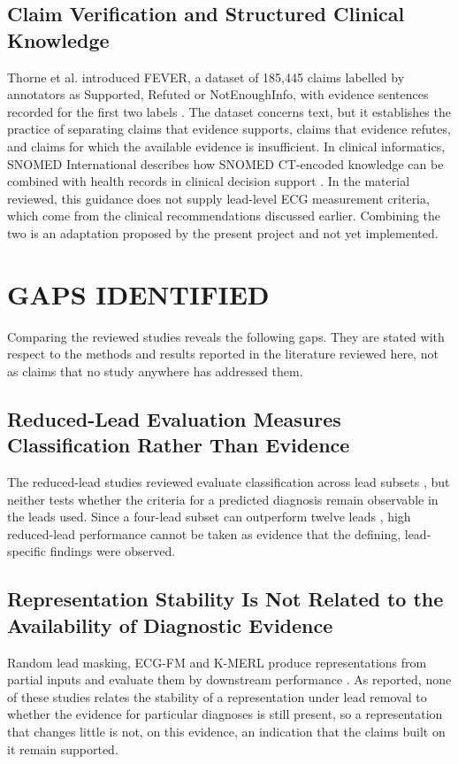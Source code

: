\subsection*{Claim Verification and Structured Clinical Knowledge}
Thorne et al. introduced FEVER, a dataset of 185,445 claims labelled by annotators as Supported, Refuted or NotEnoughInfo, with evidence sentences recorded for the first two labels \cite{THORNE2018FEVER}. The dataset concerns text, but it establishes the practice of separating claims that evidence supports, claims that evidence refutes, and claims for which the available evidence is insufficient. In clinical informatics, SNOMED International describes how SNOMED CT-encoded knowledge can be combined with health records in clinical decision support \cite{SNOMED2026CDSGUIDE}. In the material reviewed, this guidance does not supply lead-level ECG measurement criteria, which come from the clinical recommendations discussed earlier. Combining the two is an adaptation proposed by the present project and not yet implemented.

\section{GAPS IDENTIFIED}
Comparing the reviewed studies reveals the following gaps. They are stated with respect to the methods and results reported in the literature reviewed here, not as claims that no study anywhere has addressed them.

\subsection*{Reduced-Lead Evaluation Measures Classification Rather Than Evidence}
The reduced-lead studies reviewed evaluate classification across lead subsets \cite{REYNA2022ISSUES,LAI2021LEADSELECTION}, but neither tests whether the criteria for a predicted diagnosis remain observable in the leads used. Since a four-lead subset can outperform twelve leads \cite{LAI2021LEADSELECTION}, high reduced-lead performance cannot be taken as evidence that the defining, lead-specific findings were observed.

\subsection*{Representation Stability Is Not Related to the Availability of Diagnostic Evidence}
Random lead masking, ECG-FM and K-MERL produce representations from partial inputs and evaluate them by downstream performance \cite{MCKEEN2025ECGFM,OH2022LEADAGNOSTIC,LIU2025ARBITRARY}. As reported, none of these studies relates the stability of a representation under lead removal to whether the evidence for particular diagnoses is still present, so a representation that changes little is not, on this evidence, an indication that the claims built on it remain supported.

